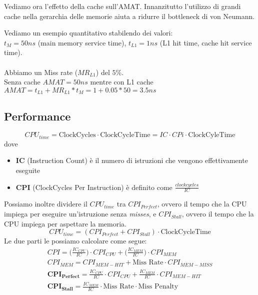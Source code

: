 Vediamo ora l'effetto della cache sull'AMAT. Innanzitutto l'utilizzo di grandi cache nella gerarchia delle memorie aiuta a ridurre il bottleneck di von Neumann. 
\begin{example}
	Vediamo un esempio quantitativo stabilendo dei valori:\\
	$t_M = 50ns$ (main memory service time), $t_{L1} = 1ns$ (L1 hit time, cache hit service time). \\\\
	Abbiamo un Miss rate ($MR_{L1}$) del $5\%$.\\
	Senza cache $AMAT = 50ns$ mentre con L1 cache $AMAT = t_{L1} + MR_{L1} * t_M = 1 + 0.05 * 50 = 3.5ns$
\end{example}

\subsection{Performance}
\begin{equation}
	CPU_{time} = \text{ClockCycles} \cdot \text{ClockCycleTime} = IC \cdot CPi \cdot \text{ClockCyleTime}
\end{equation}
dove
\begin{itemize}
	\item \textbf{IC} (Instruction Count) è il numero di istruzioni che vengono effettivamente eseguite
	\item \textbf{CPI} (ClockCycles Per Instruction) è definito come \(\frac{clockcycles}{IC}\)
\end{itemize}
Possiamo inoltre dividere il $CPU_{time}$ tra \textbf{$CPI_{Perfect}$}, ovvero il tempo che la CPU impiega per eseguire un'istruzione senza \emph{misses}, e \textbf{$CPI_{Stall}$}, ovvero il tempo che la CPU impiega per aspettare la memoria.
\begin{equation}
	CPU_{time} = (CPI_{Perfect} + CPI_{Stall}) \cdot \text{ClockCycleTime}
\end{equation}
Le due parti le possiamo calcolare come segue:
\begin{equation}
	\begin{split}
		CPI = \bigg(\frac{IC_{CPU}}{IC}\bigg) \cdot CPI_{CPU} + \bigg(\frac{IC_{MEM}}{IC}\bigg) \cdot CPI_{MEM} \\
		CPI_{MEM} = CPI_{MEM-HIT} + \text{Miss Rate} \cdot CPI_{MEM-MISS} \\
		\mathbf{CPI_{Perfect}} = \frac{IC_{CPU}}{IC} \cdot CPI_{CPU} + \frac{IC_{MEM}}{IC} \cdot CPI_{MEM-HIT} \\
		\mathbf{CPI_{Stall}} = \frac{IC_{MEM}}{IC} \cdot \text{Miss Rate} \cdot \text{Miss Penalty}
	\end{split}
\end{equation}

